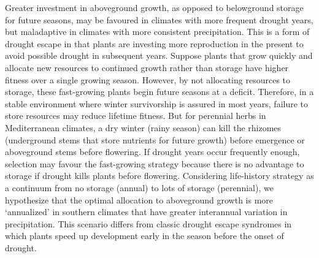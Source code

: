 \documentclass[11pt, oneside]{article}
\begin{document}
Greater investment in aboveground growth, as opposed to belowground storage for future seasons, may be favoured in climates with more frequent drought years, but maladaptive in climates with more consistent precipitation. This is a form of drought escape in that plants are investing more reproduction in the present to avoid possible drought in subsequent years. Suppose plants that grow quickly and allocate new resources to continued growth rather than storage have higher fitness over a single growing season. However, by not allocating resources to storage, these fast-growing plants begin future seasons at a deficit. Therefore, in a stable environment where winter survivorship is assured in most years, failure to store resources may reduce lifetime fitness. But for perennial herbs in Mediterranean climates, a dry winter (rainy season) can kill the rhizomes (underground stems that store nutrients for future growth) before emergence or aboveground stems before flowering. If drought years occur frequently enough, selection may favour the fast-growing strategy because there is no advantage to storage if drought kills plants before flowering. Considering life-history strategy as a continuum from no storage (annual) to lots of storage (perennial), we hypothesize that the optimal allocation to aboveground growth is more `annualized' in southern climates that have greater interannual variation in precipitation. This scenario differs from classic drought escape syndromes in which plants speed up development early in the season before the onset of drought.
\end{document}
